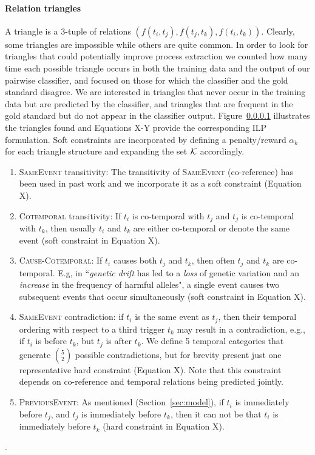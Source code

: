 \paragraph{Relation triangles} 
A triangle is a 3-tuple of relations $(f(t_i,t_j),f(t_j,t_k),f(t_i,t_k))$. Clearly, some triangles are impossible while others are quite common. In order to look for triangles that could potentially improve process extraction we counted how many time each possible triangle occurs in both the training data and the output of our pairwise classifier, and focused on those for which the classifier and the gold standard disagree. We are interested in triangles that never occur in the training data but are predicted by the classifier, and triangles that are frequent in the gold standard but do not appear in the classifier output. Figure~\ref{} illustrates the triangles found and Equations X-Y provide the corresponding ILP formulation. Soft constraints are incorporated by defining a penalty/reward $\alpha_k$ for each triangle structure and expanding the set $\mathcal{K}$ accordingly. 

\begin{enumerate}[itemsep=0pt,topsep=0pt] 
\item \textsc{SameEvent} transitivity: The transitivity of \textsc{SameEvent} (co-reference) has been used in past work \cite{Finkel08} and we incorporate it as a soft constraint (Equation X).
\item \textsc{Cotemporal} transitivity:  If $t_i$ is co-temporal with $t_j$ and $t_j$ is co-temporal with $t_k$, then usually $t_i$ and $t_k$ are either co-temporal or denote the same event (soft constraint in Equation X).
\item \textsc{Cause}-\textsc{Cotemporal}: If $t_i$ causes both $t_j$ and $t_k$, then often $t_j$ and $t_k$ are co-temporal. E.g, in ``\emph{genetic drift} has led to a \emph{loss} of genetic variation and an \emph{increase} in the frequency of harmful alleles", a single event causes two subsequent events that occur simultaneously (soft constraint in Equation X).
\item \textsc{SameEvent} contradiction: if $t_i$ is the same event as  $t_j$, then their temporal ordering with respect to a third trigger $t_k$ may result in a contradiction, e.g., if $t_i$ is before $t_k$, but $t_j$ is after $t_k$. We define 5 temporal categories that generate $5 \choose 2$ possible contradictions, but for brevity present just one representative hard constraint (Equation X). Note that this constraint depends on co-reference and temporal relations being predicted jointly.
\item \textsc{PreviousEvent}: As mentioned (Section~\ref{sec:model}), if $t_i$ is immediately before $t_j$, and $t_j$ is immediately before $t_k$, then it can not be that $t_i$ is immediately before $t_k$ (hard constraint in Equation X).
\end{enumerate}.

